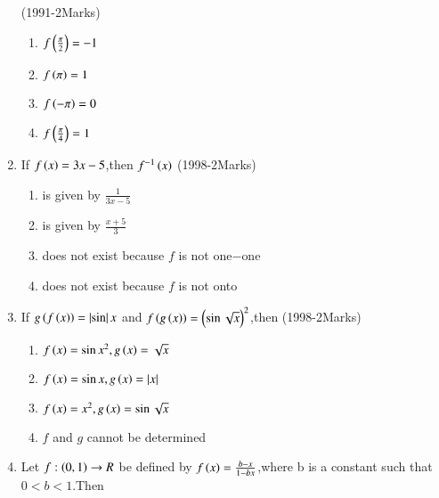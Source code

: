 \documentclass[journal,12pt,twocolumn]{IEEEtran}
\theoremstyle{remark}
\begin{document}
\begin{enumerate}[start=2]
\hfill(1991-2Marks)
\begin{multicols}{2}
\begin{enumerate} 
\item $f\left(\frac{\pi}{2}\right)=-1$
\item $f\left(\pi\right)=1$
\item $f\left(-\pi\right)=0$
\item $f\left(\frac{\pi}{4}\right)=1$
\end{enumerate}
\end{multicols}
\item If $f\left(x\right)=3x-5$,then $f^{-1}\left(x\right)$
\hfill(1998-2Marks)
\begin{enumerate} 
\item is given by $\frac{1}{3x-5}$
\item is given by $\frac{x+5}{3}$
\item does not exist because $f$ is not one$-$one
\item does not exist because $f$ is not onto 
\end{enumerate}
\item If $g\left(f\left(x\right)\right)=\left\vert\sin\right\vert{x}$ and $f\left(g\left(x\right)\right)=\left(\sin{\sqrt{x}}\right)^2$,then
\hfill(1998-2Marks)
\begin{enumerate} 
\item $f\left(x\right)=\sin{x}^2,g\left(x\right)=\sqrt{x}$
\item $f\left(x\right)=\sin{x},g\left(x\right)=\left\vert x\right\vert$
\item $f\left(x\right)=x^2,g\left(x\right)=\sin{\sqrt{x}}$
\item $f$ and $g$ cannot be determined
\end{enumerate}
\item Let $f:\left(0,1\right)\rightarrow{R}$ be defined by $f\left(x\right)=\frac{b-x}{1-bx}$,where b is a constant such that $0<b<1$.Then


\end{enumerate}
\end{document}
